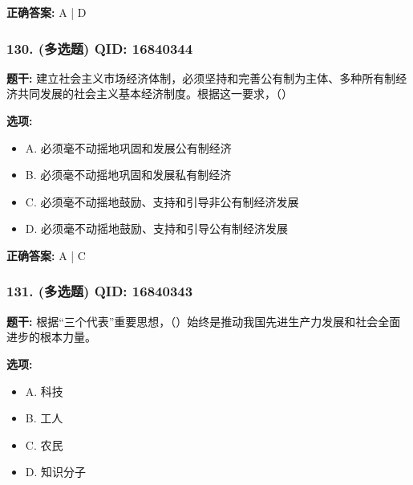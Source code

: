 \documentclass[12pt,UTF8]{ctexart}
\begin{document}
\textbf{正确答案:}
A | D

\vspace{0.3em}\hrulefill\vspace{0.7em}

\subsubsection*{130. (多选题) \small QID: 16840344}

\textbf{题干:}
建立社会主义市场经济体制，必须坚持和完善公有制为主体、多种所有制经济共同发展的社会主义基本经济制度。根据这一要求，（）

\textbf{选项:}
\begin{itemize}[leftmargin=*]

  \item A. 必须毫不动摇地巩固和发展公有制经济

  \item B. 必须毫不动摇地巩固和发展私有制经济

  \item C. 必须毫不动摇地鼓励、支持和引导非公有制经济发展

  \item D. 必须毫不动摇地鼓励、支持和引导公有制经济发展

\end{itemize}

\textbf{正确答案:}
A | C

\vspace{0.3em}\hrulefill\vspace{0.7em}

\subsubsection*{131. (多选题) \small QID: 16840343}

\textbf{题干:}
根据“三个代表”重要思想，（）始终是推动我国先进生产力发展和社会全面进步的根本力量。

\textbf{选项:}
\begin{itemize}[leftmargin=*]

  \item A. 科技

  \item B. 工人

  \item C. 农民

  \item D. 知识分子

\end{itemize}
\end{document}
